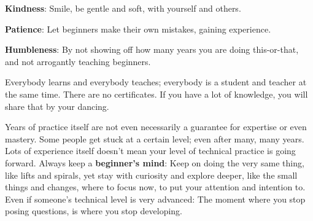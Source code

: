 \begin{itemize*}
    \item [] \textbf{Kindness}: Smile, be gentle and soft, with yourself and others.
    \item [] \textbf{Patience}: Let beginners make their own mistakes, gaining experience.
    \item [] \textbf{Humbleness}: By not showing off how many years you are doing this-or-that, and not arrogantly teaching beginners.
\end{itemize*}

Everybody learns and everybody teaches; everybody is a student and teacher at the same time.
There are no certificates.
If you have a lot of knowledge, you will share that by your dancing.

Years of practice itself are not even necessarily a guarantee for expertise or even mastery.
Some people get stuck at a certain level; even after many, many years.
Lots of experience itself doesn't mean your level of technical practice is going forward.
Always keep a \textbf{beginner's mind}: Keep on doing the very same thing, like lifts and spirals, yet stay with curiosity and explore deeper, like the small things and changes, where to focus now, to put your attention and intention to.
Even if someone's technical level is very advanced: The moment where you stop posing questions, is where you stop developing.
